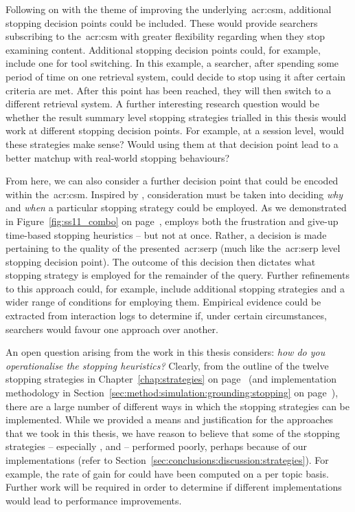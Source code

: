 Following on with the theme of improving the underlying~\gls{acr:csm}, additional stopping decision points could be included. These would provide searchers subscribing to the~\gls{acr:csm} with greater flexibility regarding when they stop examining content. Additional stopping decision points could, for example, include one for tool switching. In this example, a searcher, after spending some period of time on one retrieval system, could decide to stop using it after certain criteria are met. After this point has been reached, they will then switch to a different retrieval system. A further interesting research question would be whether the result summary level stopping strategies trialled in this thesis would work at different stopping decision points. For example, at a session level, would these strategies make sense? Would using them at that decision point lead to a better matchup with real-world stopping behaviours?

From here, we can also consider a further decision point that could be encoded within the~\gls{acr:csm}. Inspired by , consideration must be taken into deciding \emph{why} and \emph{when} a particular stopping strategy could be employed. As we demonstrated in Figure~\ref{fig:ss11_combo} on page~\pageref{fig:ss11_combo},  employs both the frustration and give-up time-based stopping heuristics -- but not at once. Rather, a decision is made pertaining to the quality of the presented~\gls{acr:serp} (much like the~\gls{acr:serp} level stopping decision point). The outcome of this decision then dictates what stopping strategy is employed for the remainder of the query. Further refinements to this approach could, for example, include additional stopping strategies and a wider range of conditions for employing them. Empirical evidence could be extracted from interaction logs to determine if, under certain circumstances, searchers would favour one approach over another.

An open question arising from the work in this thesis considers: \emph{how do you operationalise the stopping heuristics?} Clearly, from the outline of the twelve stopping strategies in Chapter~\ref{chap:strategies} on page~\pageref{chap:strategies} (and implementation methodology in Section~\ref{sec:method:simulation:grounding:stopping} on page~\pageref{sec:method:simulation:grounding:stopping}), there are a large number of different ways in which the stopping strategies can be implemented. While we provided a means and justification for the approaches that we took in this thesis, we have reason to believe that some of the stopping strategies -- especially ,  and  -- performed poorly, perhaps because of our implementations (refer to Section~\ref{sec:conclusions:discussion:strategies}). For example, the rate of gain for  could have been computed on a per topic basis. Further work will be required in order to determine if different implementations would lead to performance improvements.

